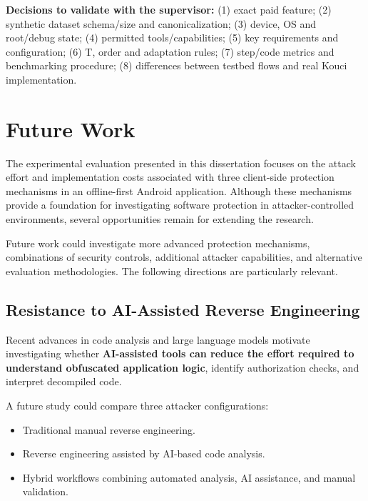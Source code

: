 \documentclass{article}
\begin{document}
\textbf{Decisions to validate with the supervisor:} (1) exact paid feature; (2) synthetic dataset schema/size and canonicalization; (3) device, OS and root/debug state; (4) permitted tools/capabilities; (5) key requirements and configuration; (6) T, order and adaptation rules; (7) step/code metrics and benchmarking procedure; (8) differences between testbed flows and real Kouci implementation.


\section{Future Work}

The experimental evaluation presented in this dissertation focuses on the attack effort and implementation costs associated with three client-side protection mechanisms in an offline-first Android application. Although these mechanisms provide a foundation for investigating software protection in attacker-controlled environments, several opportunities remain for extending the research.

Future work could investigate more advanced protection mechanisms, combinations of security controls, additional attacker capabilities, and alternative evaluation methodologies. The following directions are particularly relevant.

\subsection{Resistance to AI-Assisted Reverse Engineering}

Recent advances in code analysis and large language models motivate investigating whether \textbf{AI-assisted tools can reduce the effort required to understand obfuscated application logic}, identify authorization checks, and interpret decompiled code.

\medbreak

A future study could compare three attacker configurations:

\begin{itemize}[
    label=\textcolor{KouciGreen600}{\textbullet},
    itemsep=0pt,
    leftmargin=*
]
    \item Traditional manual reverse engineering.

    \item Reverse engineering assisted by AI-based code analysis.

    \item Hybrid workflows combining automated analysis, AI assistance, and manual validation.
    
\end{itemize}
\end{document}
